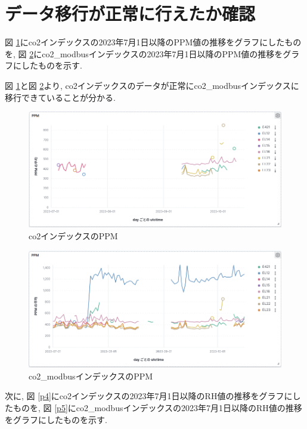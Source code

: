 \documentclass[a4j,12pt,]{jarticle}
\begin{document}
\section{データ移行が正常に行えたか確認}
図 \ref{p2}にco2インデックスの2023年7月1日以降のPPM値の推移をグラフにしたものを, 図 \ref{p3}にco2\_modbusインデックスの2023年7月1日以降のPPM値の推移をグラフにしたものを示す.

図 \ref{p2}と図 \ref{p3}より, co2インデックスのデータが正常にco2\_modbusインデックスに移行できていることが分かる.

\begin{figure}[H]
  \begin{center}
    \includegraphics[width=160mm]{co2PPM.png}
    \caption{co2インデックスのPPM}
    \label{p2}
  \end{center}
\end{figure}

\begin{figure}[H]
  \begin{center}
    \includegraphics[width=160mm]{co2ModbusPPM.png}
    \caption{co2\_modbusインデックスのPPM}
    \label{p3}
  \end{center}
\end{figure}

次に, 図 \ref{p4}にco2インデックスの2023年7月1日以降のRH値の推移をグラフにしたものを, 図 \ref{p5}にco2\_modbusインデックスの2023年7月1日以降のRH値の推移をグラフにしたものを示す.
\end{document}
